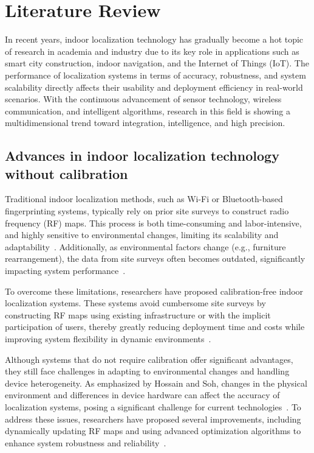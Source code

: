 \documentclass[12pt,a4paper]{article}
\numberwithin{equation}{section}
\begin{document}
\newpage
\section{Literature Review}
In recent years, indoor localization technology has gradually become a hot topic
of research in academia and industry due to its key role in applications such as
smart city construction, indoor navigation, and the Internet of Things
(IoT). The performance of localization
systems in terms of accuracy, robustness, and system scalability directly
affects their usability and deployment efficiency in real-world scenarios. With
the continuous advancement of sensor technology, wireless communication, and
intelligent algorithms, research in this field is showing a multidimensional
trend toward integration, intelligence, and high precision.

\subsection{Advances in indoor localization technology without calibration}
Traditional indoor localization methods, such as Wi-Fi or Bluetooth-based
fingerprinting systems, typically rely on prior site surveys to construct radio
frequency (RF) maps. This process is both time-consuming and labor-intensive,
and highly sensitive to environmental changes, limiting its scalability and
adaptability~\cite{liu2020survey}. Additionally, as environmental factors change
(e.g., furniture rearrangement), the data from site surveys often becomes
outdated, significantly impacting system performance~\cite{jiang2019indoor}.

To overcome these limitations, researchers have proposed calibration-free indoor
localization systems. These systems avoid cumbersome site surveys by
constructing RF maps using existing infrastructure or with the implicit
participation of users, thereby greatly reducing deployment time and costs while
improving system flexibility in dynamic
environments~\cite{HOSSAIN20151,li2018calibrationfree}.

Although systems that do not require calibration offer significant advantages,
they still face challenges in adapting to environmental changes and handling
device heterogeneity. As emphasized by Hossain and Soh, changes in the physical
environment and differences in device hardware can affect the accuracy of
localization systems, posing a significant challenge for current
technologies~\cite{HOSSAIN20151}. To address these issues, researchers have
proposed several improvements, including dynamically updating RF maps and using
advanced optimization algorithms to enhance system robustness and
reliability~\cite{zhang2020robust}.
\end{document}
